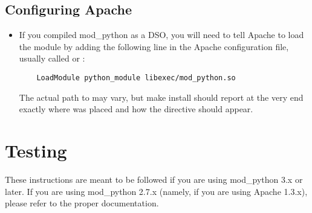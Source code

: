\subsection{Configuring Apache\label{inst-apacheconfig}}

\begin{itemize}

\item
  If you compiled mod_python as a DSO, you will need to tell Apache to
  load the module by adding the following line in the Apache
  configuration file, usually called  or
  :

  \begin{verbatim}
    LoadModule python_module libexec/mod_python.so
  \end{verbatim}

  The actual path to  may vary, but make install
  should report at the very end exactly where 
  was placed and how the  directive should appear.

\end{itemize}

\section{Testing\label{inst-testing}}

 These instructions are meant to be followed if you are
using mod_python 3.x or later. If you are using mod_python 2.7.x (namely,
if you are using Apache 1.3.x), please refer to the proper documentation.


